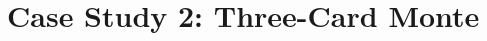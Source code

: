 \documentclass[11pt]{article}
\begin{document}


\section{Case Study 2: Three-Card Monte}
\label{sec:three-card-monte}
\end{document}
